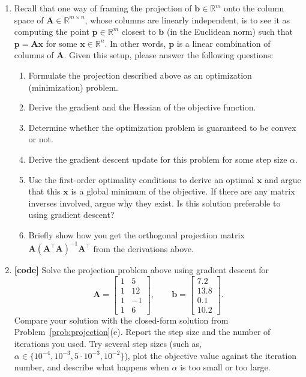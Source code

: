 \documentclass[letterpaper]{article}
\newcommand{\Real}{\mathbb{R}}
\newcommand{\tr}{^\top}
\begin{document}
\begin{enumerate}

\item \label{prob:projection} Recall that one way of framing the projection of $\bm{b} \in \Real^m$ onto the column space of $\bm{A} \in \Real^{m \times n}$, whose columns are linearly independent, is to see it as computing the point $\bm{p} \in \Real^m$ closest to $\bm{b}$ (in the Euclidean norm) such that $\bm{p} = \bm{A} \bm{x}$ for some $\bm{x}\in \Real^n$. In other words, $\bm{p}$ is a linear combination of columns of $\bm{A}$. Given this setup, please answer the following questions:
  \begin{enumerate}
  \item Formulate the projection described above as an optimization (minimization) problem.
  \item Derive the gradient and the Hessian of the objective function. 
  \item Determine whether the optimization problem is guaranteed to be convex or not.
  \item Derive the gradient descent update for this problem for some step size $\alpha$.
  \item Use the first-order optimality conditions to derive an optimal $\bm{x}$ and argue that this $\bm{x}$ is a global minimum of the objective. If there are any matrix inverses involved, argue why they exist. Is this solution preferable to using gradient descent?
  \item Briefly show how you get the orthogonal projection matrix $\bm{A}(\bm{A}\tr \bm{A})^{-1} \bm{A}\tr$ from the derivations above. 
  \end{enumerate}

\item \textbf{[code]} Solve the projection problem above using gradient descent for
  \[
   \bm{A} =  
   \begin{bmatrix}
     1 & 5 \\
     1 & 12 \\
     1 & -1 \\
     1 & 6
   \end{bmatrix}, \qquad
   \bm{b} =
   \begin{bmatrix}
     7.2 \\ 13.8 \\ 0.1 \\ 10.2
   \end{bmatrix}.
  \]
  Compare your solution with the closed-form solution from Problem~\ref{prob:projection}(e). Report the step size and the number of iterations you used. Try several step sizes (such as, $\alpha \in \{10^{-4}, 10^{-3}, 5\cdot 10^{-3}, 10^{-2}\}$), plot the objective value against the iteration number, and describe what happens when $\alpha$ is too small or too large.
  

\end{enumerate}
\end{document}
